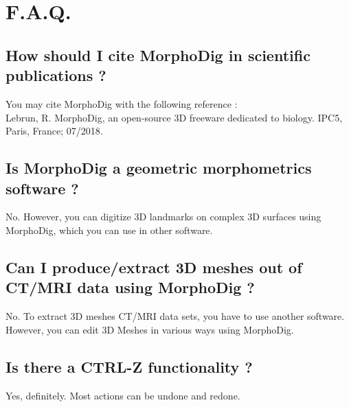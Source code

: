 
 \chapter{F.A.Q.}
		\minitoc  
    \section{How should I cite MorphoDig in scientific publications ?}
    You may  cite MorphoDig with the following reference :\\
		Lebrun, R. MorphoDig, an open-source 3D freeware dedicated to biology. IPC5, Paris, France; 07/2018.
    \section{Is MorphoDig a geometric morphometrics software ?}
    No. However, you can digitize 3D landmarks on complex 3D surfaces using MorphoDig, which you 
		can use in other software.
		\section{Can I produce/extract 3D meshes out of CT/MRI data using MorphoDig ?}
		No. To extract 3D meshes CT/MRI data sets, you have to use another software. However, you can edit 
		3D Meshes in various ways using MorphoDig.
		\section{Is there a CTRL-Z functionality ?}
		Yes, definitely. Most actions can be undone and redone. 